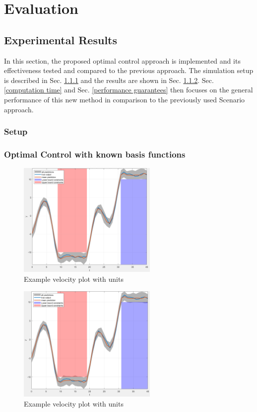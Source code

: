 \chapter{Evaluation}

\section{Experimental Results}

In this section, the proposed optimal control approach is implemented and its effectiveness tested and compared to the previous approach. The simulation setup is described in Sec. \ref{setup} and the results are shown in Sec. \ref{optimal control}. Sec. \ref{computation time} and Sec. \ref{performance guarantees} then focuses on the general performance of this new method in comparison to the previously used Scenario approach.

\subsection{Setup} \label{setup}

\subsection{Optimal Control with known basis functions} \label{optimal control}

\begin{figure}[htb]
\centering
\includegraphics[width=0.6\textwidth]{pics/Scenario_plot.png}
\caption{Example velocity plot with units}
\label{fig:vel_plot}
\end{figure}

\begin{figure}[htb]
\centering
\includegraphics[width=0.6\textwidth]{pics/Kernel_plot.png}
\caption{Example velocity plot with units}
\label{fig:vel_plot}
\end{figure}


